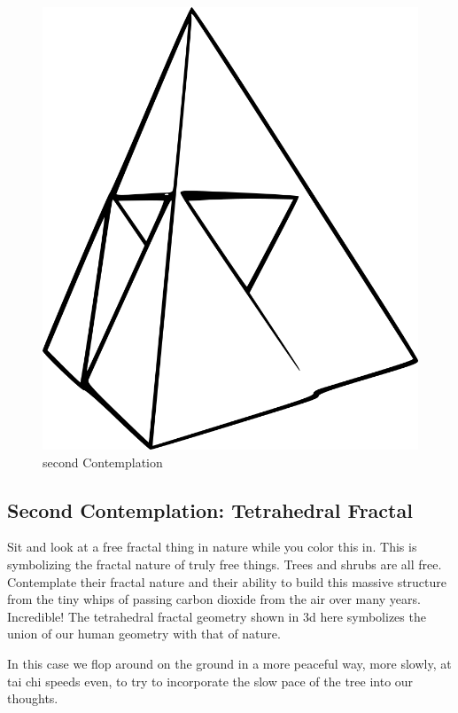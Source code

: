 \begin{figure}[htbp]
\centering
\includegraphics{images/contemplations/contemplation2C.png}
\caption{second Contemplation}
\end{figure}

\subsection{Second Contemplation: Tetrahedral
Fractal}\label{second-contemplation-tetrahedral-fractal}

Sit and look at a free fractal thing in nature while you color this in.
This is symbolizing the fractal nature of truly free things. Trees and
shrubs are all free. Contemplate their fractal nature and their ability
to build this massive structure from the tiny whips of passing carbon
dioxide from the air over many years. Incredible! The tetrahedral
fractal geometry shown in 3d here symbolizes the union of our human
geometry with that of nature.

In this case we flop around on the ground in a more peaceful way, more
slowly, at tai chi speeds even, to try to incorporate the slow pace of
the tree into our thoughts.
